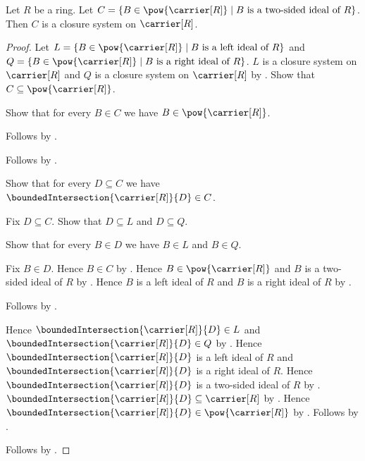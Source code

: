 \begin{proposition}\label{two_sided_ideal_carriers_form_closure_system}
    Let $R$ be a ring.
    Let
        $C=\{B\in\pow{\carrier[R]}\mid
            \text{$B$ is a two-sided ideal of $R$}\}$.
    Then $C$ is a closure system on $\carrier[R]$.
\end{proposition}
\begin{proof}
    Let
        $L=\{B\in\pow{\carrier[R]}\mid
            \text{$B$ is a left ideal of $R$}\}$ and
        $Q=\{B\in\pow{\carrier[R]}\mid
            \text{$B$ is a right ideal of $R$}\}$.
    $L$ is a closure system on $\carrier[R]$ and
        $Q$ is a closure system on $\carrier[R]$ by
        .
    Show that $C\subseteq\pow{\carrier[R]}$.
    \begin{subproof}
        Show that for every $B\in C$ we have
            $B\in\pow{\carrier[R]}$.
        \begin{subproof}
            Follows by \auto.
        \end{subproof}
        Follows by .
    \end{subproof}
    Show that for every $D\subseteq C$ we have
        $\boundedIntersection{\carrier[R]}{D}\in C$.
    \begin{subproof}
        Fix $D\subseteq C$.
        Show that $D\subseteq L$ and $D\subseteq Q$.
        \begin{subproof}
            Show that for every $B\in D$ we have $B\in L$ and $B\in Q$.
            \begin{subproof}
                Fix $B\in D$.
                Hence $B\in C$ by .
                Hence $B\in\pow{\carrier[R]}$ and
                    $B$ is a two-sided ideal of $R$ by \auto.
                Hence $B$ is a left ideal of $R$ and
                    $B$ is a right ideal of $R$ by
                    .
            \end{subproof}
            Follows by .
        \end{subproof}
        Hence $\boundedIntersection{\carrier[R]}{D}\in L$ and
            $\boundedIntersection{\carrier[R]}{D}\in Q$ by
            .
        Hence $\boundedIntersection{\carrier[R]}{D}$ is a left ideal of
            $R$ and $\boundedIntersection{\carrier[R]}{D}$ is a right
            ideal of $R$.
        Hence $\boundedIntersection{\carrier[R]}{D}$ is a two-sided ideal
            of $R$ by .
        $\boundedIntersection{\carrier[R]}{D}
            \subseteq\carrier[R]$ by
            .
        Hence $\boundedIntersection{\carrier[R]}{D}
            \in\pow{\carrier[R]}$ by .
        Follows by \auto.
    \end{subproof}
    Follows by .
\end{proof}

